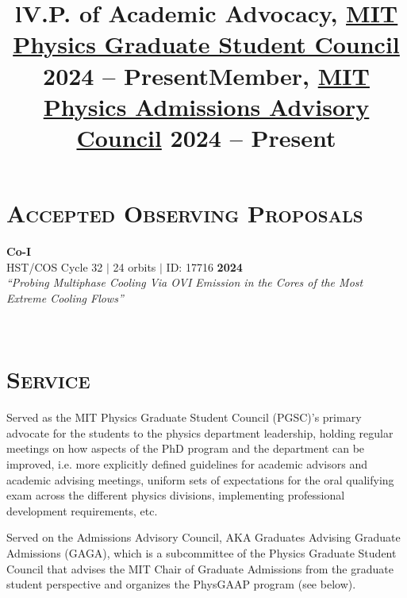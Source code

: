 \documentclass[marg, centered]{res}
\begin{document}
\begin{resume}
\begin{talks}[itemindent=0pt, leftmargin=19pt]
\end{talks}


\section{{\scshape \bfseries Accepted Observing Proposals}}
\textbf{Co-I} \\
HST/COS Cycle 32 $|$ 24 orbits $|$ ID: 17716 \hfill \textbf{2024} \\
\textit{``Probing Multiphase Cooling Via OVI Emission in the Cores of the Most Extreme Cooling Flows''}


\begin{format}
\title{l} \\
\body
\end{format}

\section{{\scshape \bfseries Service}}

\title{\textbf{V.P. of Academic Advocacy}, \href{https://physics-gsc.scripts.mit.edu/home/}{\color{dkbu} MIT Physics Graduate Student Council} \hfill \textbf{2024 -- Present}}
\begin{position}
{\small Served as the MIT Physics Graduate Student Council (PGSC)'s primary advocate for the students to the physics department leadership, holding regular meetings on how aspects of the PhD program and the department can be improved, i.e. more explicitly defined guidelines for academic advisors and academic advising meetings, uniform sets of expectations for the oral qualifying exam across the different physics divisions, implementing professional development requirements, etc.}
\end{position}

\vspace{-0.2cm}
\title{\textbf{Member}, \href{https://physics-gsc.scripts.mit.edu/home/gaga/}{\color{dkbu} MIT Physics Admissions Advisory Council} \hfill \textbf{2024 -- Present}}
\begin{position}
{\small Served on the Admissions Advisory Council, AKA Graduates Advising Graduate Admissions (GAGA), which is a subcommittee of the Physics Graduate Student Council that advises the MIT Chair of Graduate Admissions from the graduate student perspective and organizes the PhysGAAP program (see below).}
\end{position}


\end{resume}
\end{document}

